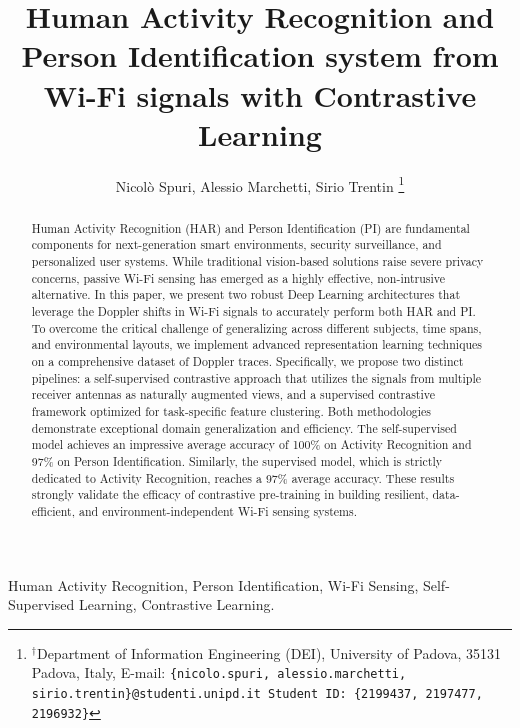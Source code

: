 \documentclass[10pt, conference, letterpaper]{IEEEtran}
\title{Human Activity Recognition and Person Identification system from Wi-Fi signals with Contrastive Learning}
\author{Nicolò Spuri, Alessio Marchetti, Sirio Trentin\dag
\thanks{$^\dag$Department of Information Engineering (DEI), University of Padova, 35131 Padova, Italy, \newline E-mail: \texttt{\{nicolo.spuri, alessio.marchetti, sirio.trentin\}@studenti.unipd.it \newline Student ID: \texttt{\{2199437, 2197477, 2196932\}}}}}
\begin{document}
\maketitle

\begin{abstract}
Human Activity Recognition (HAR) and Person Identification (PI) are fundamental components for next-generation smart environments, security surveillance, and personalized user systems. While traditional vision-based solutions raise severe privacy concerns, passive Wi-Fi sensing has emerged as a highly effective, non-intrusive alternative. In this paper, we present two robust Deep Learning architectures that leverage the Doppler shifts in Wi-Fi signals to accurately perform both HAR and PI. To overcome the critical challenge of generalizing across different subjects, time spans, and environmental layouts, we implement advanced representation learning techniques on a comprehensive dataset of Doppler traces. Specifically, we propose two distinct pipelines: a self-supervised contrastive approach that utilizes the signals from multiple receiver antennas as naturally augmented views, and a supervised contrastive framework optimized for task-specific feature clustering. Both methodologies demonstrate exceptional domain generalization and efficiency. The self-supervised model achieves an impressive average accuracy of 100\% on Activity Recognition and 97\% on Person Identification. Similarly, the supervised model, which is strictly dedicated to Activity Recognition, reaches a 97\% average accuracy. These results strongly validate the efficacy of contrastive pre-training in building resilient, data-efficient, and environment-independent Wi-Fi sensing systems.
\end{abstract}

\begin{IEEEkeywords}
  Human Activity Recognition, Person Identification, Wi-Fi Sensing, Self-Supervised Learning, Contrastive Learning.
\end{IEEEkeywords}













\end{document}
